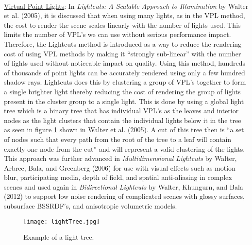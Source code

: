 \paragraph{}
\underline{Virtual Point Lights}: In \textit{Lightcuts: A Scalable Approach to Illumination} by Walter et al. (2005), it is discussed that when using many lights, as in the VPL method, the cost to render the scene scales linearly with the number of lights used.  This limits the number of VPL's we can use without serious performance impact.  Therefore, the Lightcuts method is introduced as a way to reduce the rendering cost of using VPL methods by making it “strongly sub-linear” with the number of lights used without noticeable impact on quality.  Using this method, hundreds of thousands of point lights can be accurately rendered using only a few hundred shadow rays.  Lightcuts does this by clustering a group of VPL's together to form a single brighter light thereby reducing the cost of rendering the group of lights present in the cluster group to a single light.  This is done by using a global light tree which is a binary tree that has individual VPL's as the leaves and interior nodes as the light clusters that contain the individual lights below it in the tree as seen in figure \ref{fig:lightTree} shown in Walter et al. (2005).  A cut of this tree then is ``a set of nodes such that every path from the root of the tree to a leaf will contain exactly one node from the cut'' and will represent a valid clustering of the lights.  This approach was further advanced in \textit{Multidimensional Lightcuts} by Walter, Arbree, Bala, and Greenberg (2006) for use with visual effects such as motion blur, participating media, depth of field, and spatial anti-aliasing in complex scenes and used again in \textit{Bidirectional Lightcuts} by Walter, Khungurn, and Bala (2012) to support low noise rendering of complicated scenes with glossy surfaces, subsurface BSSRDF's, and anisotropic volumetric models.

\begin{figure}[h!]
  \centering
    \texttt{[image: lightTree.jpg]}
  \caption{Example of a light tree.}
	\label{fig:lightTree}
\end{figure}


